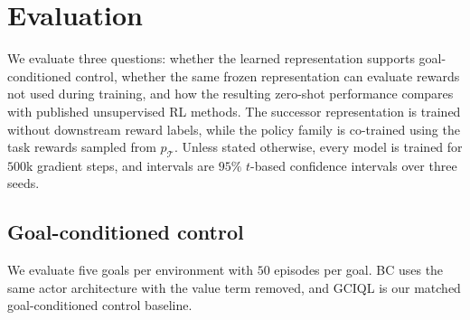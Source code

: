 \documentclass[11pt]{article}
\begin{document}
\section{Evaluation}
\label{sec:evaluation}

We evaluate three questions: whether the learned representation supports goal-conditioned control, whether the same frozen representation can evaluate rewards not used during training, and how the resulting zero-shot performance compares with published unsupervised RL methods. The successor representation is trained without downstream reward labels, while the policy family is co-trained using the task rewards sampled from $p_{\mathcal T}$. Unless stated otherwise, every model is trained for $500$k gradient steps, and intervals are $95\%$ $t$-based confidence intervals over three seeds.


\subsection{Goal-conditioned control}

We evaluate five goals per environment with $50$ episodes per goal. BC uses the same actor architecture with the value term removed, and GCIQL is our matched goal-conditioned control baseline.
\end{document}
